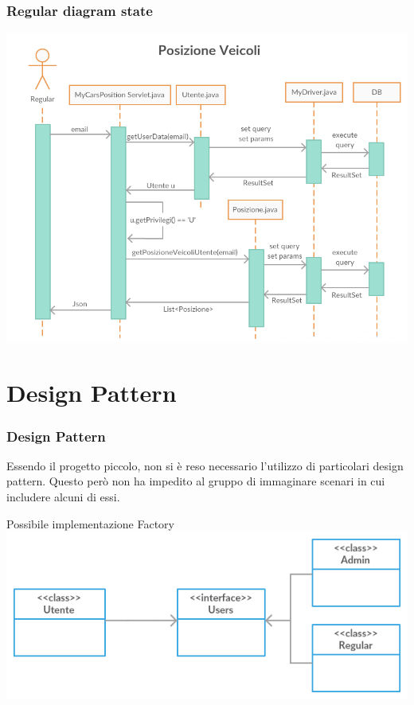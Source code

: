 \documentclass[a4paper,12pt]{beamer}
\begin{document}
\begin{frame}
\frametitle{Regular diagram state}
\includegraphics[scale=0.38]{RegularSeq.png}
\end{frame}

\pagebreak

\section{Design Pattern}
\begin{frame}
\frametitle{Design Pattern}
Essendo il progetto piccolo, non si è reso necessario l'utilizzo di particolari design pattern. Questo però non ha impedito al gruppo di immaginare scenari in cui includere alcuni di essi. 

Possibile implementazione Factory
\includegraphics[scale=.5]{DesignPattern.png}
\end{frame}
\end{document}
